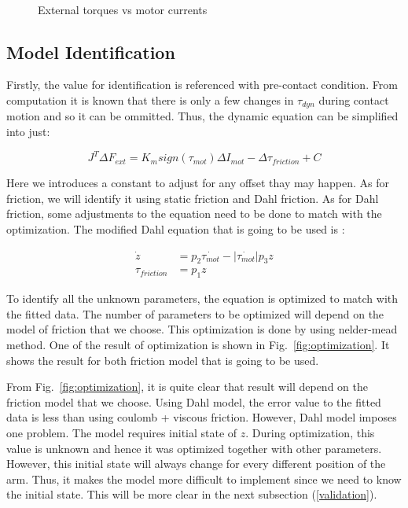 \documentclass[letterpaper, 10 pt, conference]{ieeeconf}
\newcommand{\fref}[1]{Fig.~\ref{#1}}
\begin{document}
\begin{figure}[t]
   \,
  \caption{ External torques vs motor currents}
  \label{fig:prelim result}
\end{figure}

\subsection{Model Identification}
\label{identification}

Firstly, the value for identification is referenced with pre-contact condition. From computation it is known that there is only a few changes in $\tau_{dyn}$ during contact motion and so it can be ommitted. Thus, the dynamic equation can be simplified into just:

\begin{equation}
  J^{T} \Delta F_{ext} = K_{m} sign\left(\tau_{mot}\right) \Delta I_{mot} - \Delta \tau_{friction} + C
\end{equation}
 
Here we introduces a constant to adjust for any offset thay may happen. As for friction, we will identify it using static friction and Dahl friction. As for Dahl friction, some adjustments to the equation need to be done to match with the optimization. The modified Dahl equation that is going to be used is : 

\begin{align}
  \dot{z} &= p_{2 }\dot{\tau_{mot}} - \left|\dot{\tau_{mot}}\right| p_{3} z \\
  \tau_{friction} &= p_{1} z
\end{align}

To identify all the unknown parameters, the equation is optimized to match with the fitted data. The number of parameters to be optimized will depend on the model of friction that we choose. This optimization is done by using nelder-mead method. One of the result of optimization is shown in \fref{fig:optimization}. It shows the result for both friction model that is going to be used. 

From \fref{fig:optimization}, it is quite clear that result will depend on the friction model that we choose. Using Dahl model, the error value to the fitted data is less than using coulomb + viscous friction. However, Dahl model imposes one problem. The model requires initial state of $z$. During optimization, this value is unknown and hence it was optimized together with other parameters. However, this initial state will always change for every different position of the arm. Thus, it makes the model more difficult to implement since we need to know the initial state. This will be more clear in the next subsection (\ref{validation}).
\end{document}
